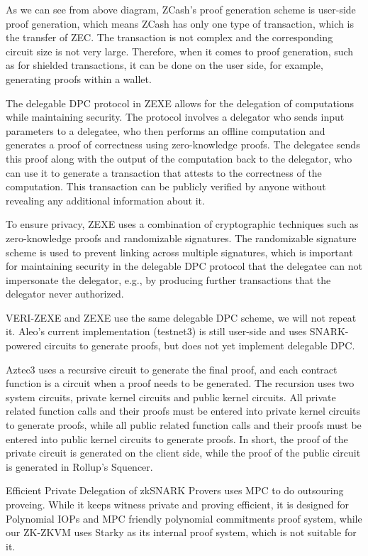 As we can see from above diagram, ZCash's proof generation scheme is user-side proof generation, which means ZCash has only one type of transaction, which is the transfer of ZEC. The transaction is not complex and the corresponding circuit size is not very large. Therefore, when it comes to proof generation, such as for shielded transactions, it can be done on the user side, for example, generating proofs within a wallet.

The delegable DPC protocol in ZEXE\cite{cryptoeprint:2018/962} allows for the delegation of computations while maintaining security. The protocol involves a delegator who sends input parameters to a delegatee, who then performs an offline computation and generates a proof of correctness using zero-knowledge proofs. The delegatee sends this proof along with the output of the computation back to the delegator, who can use it to generate a transaction that attests to the correctness of the computation. This transaction can be publicly verified by anyone without revealing any additional information about it.

To ensure privacy, ZEXE uses a combination of cryptographic techniques such as zero-knowledge proofs and randomizable signatures. The randomizable signature scheme is used to prevent linking across multiple signatures, which is important for maintaining security in the delegable DPC protocol that the delegatee can not impersonate the delegator, e.g., by producing further transactions that the delegator never authorized.

VERI-ZEXE and ZEXE use the same delegable DPC scheme, we will not repeat it. Aleo's current implementation (testnet3) is still user-side and uses SNARK-powered circuits to generate proofs, but does not yet implement delegable DPC.

Aztec3\cite{website:Aztec3} uses a recursive circuit to generate the final proof, and each contract function is a circuit when a proof needs to be generated. The recursion uses two system circuits, private kernel circuits and public kernel circuits. All private related function calls and their proofs must be entered into private kernel circuits to generate proofs, while all public related function calls and their proofs must be entered into public kernel circuits to generate proofs. In short, the proof of the private circuit is generated on the client side, while the proof of the public circuit is generated in Rollup's Squencer.

Efficient Private Delegation of zkSNARK Provers\cite{website:epdzp} uses MPC to do outsouring proveing. While it keeps witness private and proving efficient, it is designed for Polynomial IOPs and MPC friendly polynomial commitments proof system, while our ZK-ZKVM uses Starky as its internal proof system, which is not suitable for it.

